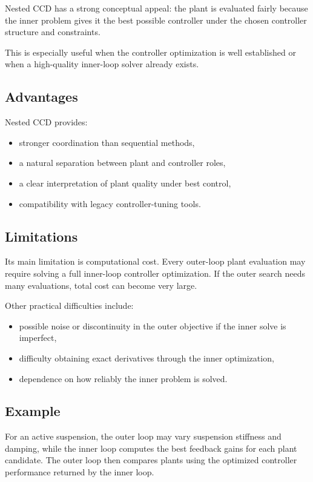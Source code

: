 \documentclass[11pt]{article}
\begin{document}
Nested CCD has a strong conceptual appeal: the plant is evaluated fairly because the inner problem gives it the best possible controller under the chosen controller structure and constraints.

This is especially useful when the controller optimization is well established or when a high-quality inner-loop solver already exists.

\subsection{Advantages}

Nested CCD provides:
\begin{itemize}[leftmargin=1.4em]
  \item stronger coordination than sequential methods,
  \item a natural separation between plant and controller roles,
  \item a clear interpretation of plant quality under best control,
  \item compatibility with legacy controller-tuning tools.
\end{itemize}

\subsection{Limitations}

Its main limitation is computational cost. Every outer-loop plant evaluation may require solving a full inner-loop controller optimization. If the outer search needs many evaluations, total cost can become very large.

Other practical difficulties include:
\begin{itemize}[leftmargin=1.4em]
  \item possible noise or discontinuity in the outer objective if the inner solve is imperfect,
  \item difficulty obtaining exact derivatives through the inner optimization,
  \item dependence on how reliably the inner problem is solved.
\end{itemize}

\subsection{Example}

For an active suspension, the outer loop may vary suspension stiffness and damping, while the inner loop computes the best feedback gains for each plant candidate. The outer loop then compares plants using the optimized controller performance returned by the inner loop.
\end{document}
